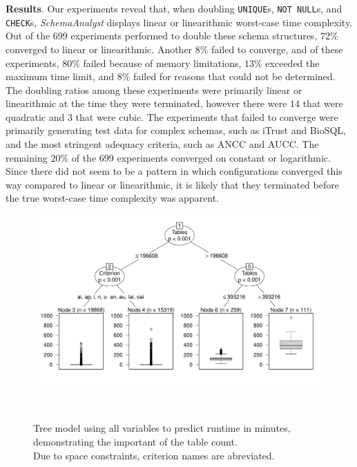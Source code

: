 
\textbf{Results}. Our experiments reveal that, when doubling \texttt{UNIQUE}s, {\tt NOT NULL}s, and {\tt CHECK}s,
\textit{SchemaAnalyst} displays linear or linearithmic worst-case time complexity.  Out of the 699 experiments performed
to double these schema structures, $72\%$ converged to linear or linearithmic.  Another $8\%$ failed to converge, and of
these experiments, $80\%$ failed because of memory limitations, $13\%$ exceeded the maximum time limit, and $8\%$ failed
for reasons that could not be determined.  The doubling ratios among these experiments were primarily linear or
linearithmic at the time they were terminated, however there were $14$ that were quadratic and $3$ that were cubic.  The
experiments that failed to converge were primarily generating test data for complex schemas, such as iTrust and BioSQL,
and the most stringent adequacy criteria, such as ANCC and AUCC. The remaining $20\%$ of the 699 experiments converged
on constant or logarithmic.  Since there did not seem to be a pattern in which configurations converged this way
compared to linear or linearithmic, it is likely that they terminated before the true worst-case time complexity was
apparent.

\begin{figure}[t]
\centering
  \centering
  \includegraphics[width=1.025\linewidth]{diagrams/Tree.pdf}
  \vspace*{-.25in}
  \caption{Tree model using all variables to predict runtime in minutes,
  demonstrating the important of the table count. \\ Due to space
  constraints, criterion names are abreviated.
  \vspace{-.35in}}~\label{fig:atree}
\end{figure}

